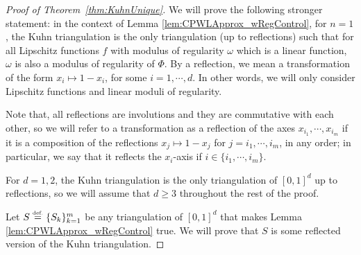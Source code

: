 \documentclass{article}
\numberwithin{equation}{section}
\theoremstyle{definition}
\newcommand{\eqdef}{\ensuremath{\stackrel{\mbox{\upshape\tiny def.}}{=}}}
\begin{document}
\begin{proof}[{Proof of Theorem~\ref{thm:KuhnUnique}}]
We will prove the following stronger statement: in the context of Lemma \ref{lem:CPWLApprox_wRegControl}, for $n=1$, the Kuhn triangulation is the only triangulation (up to reflections) such that for all Lipschitz functions $f$ with modulus of regularity $\omega$ which is a linear function, $\omega$ is also a modulus of regularity of $\Phi$. By a reflection, we mean a transformation of the form $x_i \mapsto 1-x_i$, for some $i=1,\cdots,d$. In other words, we will only consider Lipschitz functions and linear moduli of regularity.

Note that, all reflections are involutions and they are commutative with each other, so we will refer to a transformation as a reflection of the axes $x_{i_1},\cdots,x_{i_m}$ if it is a composition of the reflections $x_j \mapsto 1-x_j$ for $j=i_1,\cdots,i_m$, in any order; in particular, we say that it reflects the $x_i$-axis if $i\in\{i_1,\cdots,i_m\}$.

For $d=1,2$, the Kuhn triangulation is the only triangulation of $[0,1]^d$ up to reflections, so we will assume that $d\ge 3$ throughout the rest of the proof. 

Let $S \eqdef \{S_k\}_{k=1}^m$ be any triangulation of $[0,1]^d$ that makes Lemma \ref{lem:CPWLApprox_wRegControl} true. We will prove that $S$ is some reflected version of the Kuhn triangulation. 


\end{proof}
\end{document}
